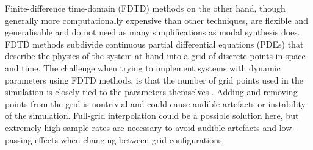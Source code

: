 Finite-difference time-domain (FDTD) methods on the other hand, though generally more computationally expensive than other techniques, are flexible and generalisable and do not need as many simplifications as modal synthesis does. %
FDTD methods subdivide continuous partial differential equations (PDEs) that describe the physics of the system at hand into a grid of discrete points in space and time.  The challenge when trying to implement systems with dynamic parameters using FDTD methods, is that the number of grid points used in the simulation is closely tied to the parameters themselves . Adding and removing points from the grid is nontrivial and could cause audible artefacts or instability of the simulation. Full-grid interpolation \cite[Ch. 5]{bilbao2009} could be a possible solution here, but extremely high sample rates are necessary to avoid audible artefacts and low-passing effects when changing between grid configurations. 

%


